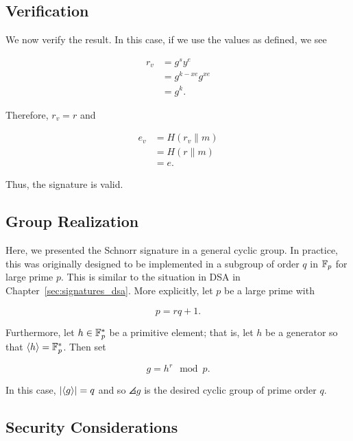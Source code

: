 \subsection{Verification}

We now verify the result.
In this case, if we use the values as defined, we see

\begin{align}
    r_{v} &= g^{s}y^{e} \nonumber\\
        &= g^{k-xe}g^{xe} \nonumber\\
        &= g^{k}.
\end{align}

\noindent
Therefore, $r_{v} = r$ and

\begin{align}
    e_{v} &= H(r_{v}\|m) \nonumber\\
        &= H(r\|m) \nonumber\\
        &= e.
\end{align}

\noindent
Thus, the signature is valid.

\subsection{Group Realization}

Here, we presented the Schnorr signature in a general \gls{cyclic group}.
In practice, this was originally designed to be implemented
in a \gls{subgroup} of order $q$ in $\mathbb{F}_{p}$ for large prime $p$.
This is similar to the situation in DSA
in Chapter~\ref{sec:signatures_dsa}.
More explicitly, let $p$ be a large prime with

\begin{equation}
    p = rq + 1.
\end{equation}

\noindent
Furthermore, let $h\in\mathbb{F}_{p}^{*}$ be a primitive element;
that is, let $h$ be a generator so that $\left\langle h \right\rangle = \mathbb{F}_{p}^{*}$.
Then set

\begin{equation}
    g = h^{r} \mod p.
\end{equation}

\noindent
In this case, $\left| \left\langle g \right\rangle \right| = q$ and so $\angles{g}$
is the desired \gls{cyclic group} of prime order $q$.

\subsection{Security Considerations}
\label{sig:schnorr_security}

